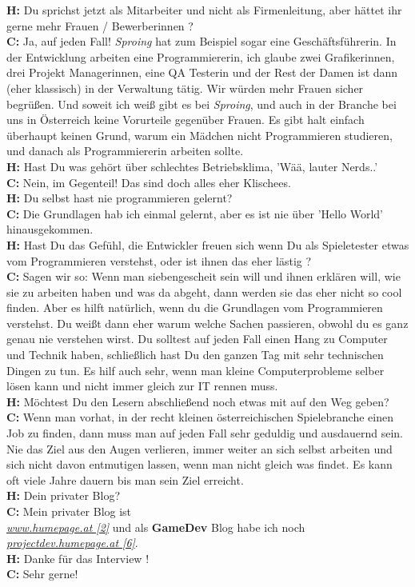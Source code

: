 \textbf{H:} Du sprichst jetzt als Mitarbeiter und nicht als Firmenleitung, aber hättet ihr gerne mehr Frauen / Bewerberinnen ? \\
\textbf{C:} Ja, auf jeden Fall! \textit{Sproing} hat zum Beispiel sogar eine Geschäftsführerin. In der Entwicklung arbeiten eine Programmiererin, ich glaube zwei Grafikerinnen, drei Projekt Managerinnen, eine QA Testerin und der Rest der Damen ist dann (eher klassisch) in der Verwaltung tätig. Wir würden mehr Frauen sicher begrüßen. Und soweit ich weiß gibt es bei \textit{Sproing}, und auch in der Branche bei uns in Österreich keine Vorurteile gegenüber Frauen. Es gibt halt einfach überhaupt keinen Grund, warum ein Mädchen nicht Programmieren studieren, und danach als Programmiererin arbeiten sollte. \\
\textbf{H:} Hast Du was gehört über schlechtes Betriebsklima, 'Wää, lauter Nerds..' \\
\textbf{C:} Nein, im Gegenteil! Das sind doch alles eher Klischees. \\
\textbf{H:} Du selbst hast nie programmieren gelernt? \\
\textbf{C:} Die Grundlagen hab ich einmal gelernt, aber es ist nie über 'Hello World' hinausgekommen. \\
\textbf{H:} Hast Du das Gefühl, die Entwickler freuen sich wenn Du als Spieletester etwas vom Programmieren verstehst, oder ist ihnen das eher lästig ? \\
\textbf{C:} Sagen wir so: Wenn man siebengescheit sein will und ihnen erklären will, wie sie zu arbeiten haben und was da abgeht, dann werden sie das eher nicht so cool finden. Aber es hilft natürlich, wenn du die Grundlagen vom Programmieren verstehst. Du weißt dann eher warum welche Sachen passieren, obwohl du es ganz genau nie verstehen wirst. Du solltest auf jeden Fall einen Hang zu Computer und Technik haben, schließlich hast Du den ganzen Tag mit sehr technischen Dingen zu tun. Es hilf auch sehr, wenn man kleine Computerprobleme selber lösen kann und nicht immer gleich zur IT rennen muss. \\
\textbf{H:} Möchtest Du den Lesern abschließend noch etwas mit auf den Weg geben? \\
\textbf{C:} Wenn man vorhat, in der recht kleinen österreichischen Spielebranche einen Job zu finden, dann muss man auf jeden Fall sehr geduldig und ausdauernd sein. Nie das Ziel aus den Augen verlieren, immer weiter an sich selbst arbeiten und sich nicht davon entmutigen lassen, wenn man nicht gleich was findet. Es kann oft viele Jahre dauern bis man sein Ziel erreicht.  \\
\textbf{H:} Dein privater Blog? \\
\textbf{C:} Mein privater Blog ist \\ \href{http://www.humepage.at}{\textit{www.humepage.at [2]}}
und als \textbf{GameDev} Blog habe ich noch \\ \href{http://projectdev.humepage.at/}{\textit{projectdev.humepage.at [6]}}. \\
\textbf{H:} Danke für das Interview ! \\
\textbf{C:} Sehr gerne! \\

